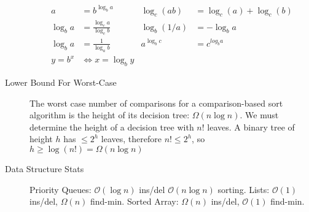 \documentclass[8pt]{article}
\begin{document}
\begin{multicols}{2}
\begin{description}
\begin{equation*}
\begin{aligned}
        a &= b^{\log_b a} &
        \log_c(ab) &= \log_c(a) + \log_c(b) \\
        \log_b a &= \frac{\log_c a}{\log_c b} &
        \log_b(1/a) &= -\log_b a \\
        \log_b a &= \frac{1}{\log_a b} &
        a^{\log_b c} &= c^{log_b a} \\
        y = b^x &\Leftrightarrow x=\log_b y &
      \end{aligned}
    \end{equation*}
  \item[Lower Bound For Worst-Case] The worst case number of
    comparisons for a comparison-based sort algorithm is the height of
    its decision tree: $\Omega(n\log n)$. We must determine the height
    of a decision tree with $n!$ leaves. A binary tree of height $h$
    has $\le 2^h$ leaves, therefore $n!\le 2^h$, so
    $h\ge\log(n!) = \Omega(n\log n)$
  \item[Data Structure Stats] Priority Queues: $\mathcal{O}(\log n)$
    ins/del $\mathcal{O}(n\log n)$ sorting. Lists: $\mathcal{O}(1)$
    ins/del, $\Omega(n)$ find-min. Sorted Array: $\Omega(n)$ ins/del,
    $\mathcal{O}(1)$ find-min.
  \end{description} %
\end{multicols}
\end{document}
